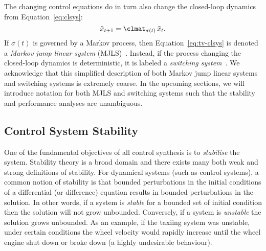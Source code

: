 The changing control equations do in turn also change the closed-loop dynamics from Equation~\eqref{eq:clsys}:
%
\begin{equation}%
    \label{eq:tv-clsys}%
    \tilde{x}_{t+1} = \clmat_{\sigma(t)}\, \tilde{x}_t.
\end{equation}
%
If $\sigma(t)$ is governed by a Markov process, then Equation~\eqref{eq:tv-clsys} is denoted a \emph{Markov jump linear system} (MJLS)~\cite{Feng:1992}.
Instead, if the process changing the closed-loop dynamics is deterministic, it is labeled a \emph{switching system}~\cite{Liberzon:2003}.
We acknowledge that this simplified description of both Markov jump linear systems and switching systems is extremely coarse.
In the upcoming sections, we will introduce notation for both MJLS and switching systems such that the stability and performance analyses are unambiguous.



\subsection{Control System Stability}%
\label{sec:background:stability}%
%
One of the fundamental objectives of all control synthesis is to \emph{stabilise} the system.
Stability theory is a broad domain and there exists many both weak and strong definitions of stability.
For dynamical systems (such as control systems), a common notion of stability is that bounded perturbations in the initial conditions of a differential (or difference) equation results in bounded perturbations in the solution.
In other words, if a system is \emph{stable} for a bounded set of initial condition then the solution will not grow unbounded.
Conversely, if a system is \emph{unstable} the solution grows unbounded.
As an example, if the taxiing system was unstable, under certain conditions the wheel velocity would rapidly increase until the wheel engine shut down or broke down (a highly undesirable behaviour).


